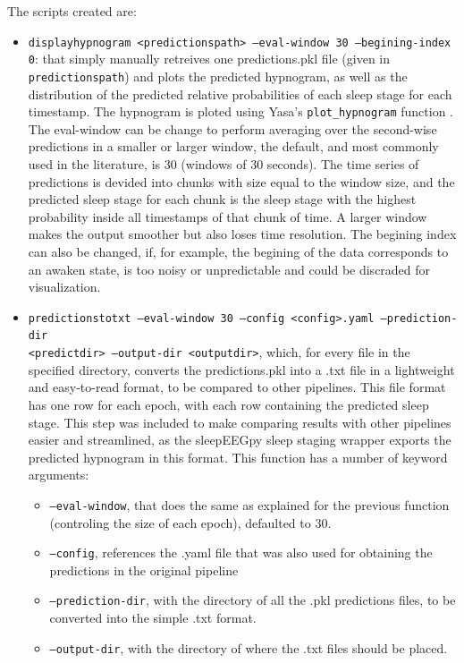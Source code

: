 The scripts created are:
\vspace{-0.3cm}
\begin{itemize}
    \item \texttt{display\textunderscore hypnogram <predictionspath> --eval-window 30 --begining-index 0}: that simply manually retreives one predictions.pkl file (given in \texttt{predictionspath}) and plots the predicted hypnogram, as well as the distribution of the predicted relative probabilities of each sleep stage for each timestamp. The hypnogram is ploted using Yasa's \texttt{plot\_hypnogram} function \cite{2021yasa}.
    The eval-window can be change to perform averaging over the second-wise predictions in a smaller or larger window, the default, and most commonly used in the literature, is 30 (windows of 30 seconds). The time series of predictions is devided into chunks with size equal to the window size, and the predicted sleep stage for each chunk is the sleep stage with the highest probability inside all timestamps of that chunk of time. A larger window makes the output smoother but also loses time resolution. The begining index can also be changed, if, for example, the begining of the data corresponds to an awaken state, is too noisy or unpredictable and could be discraded for visualization.


    \item \texttt{predictions\textunderscore to\textunderscore txt --eval-window 30 --config <config>.yaml --prediction-dir \\ <predictdir> --output-dir <outputdir>}, which, for every file in the specified directory, converts the predictions.pkl into a .txt file in a lightweight and easy-to-read format, to be compared to other pipelines. This file format has one row for each epoch, with each row containing the predicted sleep stage. This step was included to make comparing results with other pipelines easier and streamlined, as the sleepEEGpy sleep staging wrapper \cite{belonosov2023sleepeegpy} exports the predicted hypnogram in this format. This function has a number of keyword arguments:
    \begin{itemize}
        \itemsep-0.4em
        \item \texttt{--eval-window}, that does the same as explained for the previous function (controling the size of each epoch), defaulted to 30.
        \item \texttt{--config}, references the .yaml file that was also used for obtaining the predictions in the original pipeline
        \item \texttt{--prediction-dir}, with the directory of all the .pkl predictions files, to be converted into the simple .txt format.
        \item \texttt{--output-dir}, with the directory of where the .txt files should be placed.
    \end{itemize}



\end{itemize}
